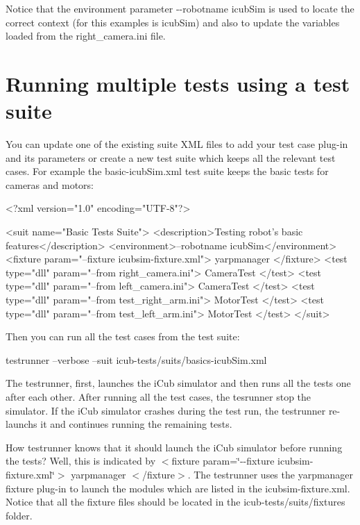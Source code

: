Notice that the environment parameter {\ttfamily -\/-\/robotname icub\-Sim} is used to locate the correct context (for this examples is {\ttfamily icub\-Sim}) and also to update the variables loaded from the {\ttfamily right\-\_\-camera.\-ini} file.\hypertarget{writing-and-running_running_multiple_tests}{}\section{Running multiple tests using a test suite}\label{writing-and-running_running_multiple_tests}
You can update one of the existing suite X\-M\-L files to add your test case plug-\/in and its parameters or create a new test suite which keeps all the relevant test cases. For example the {\ttfamily basic-\/icub\-Sim.\-xml} test suite keeps the basic tests for cameras and motors\-:


\begin{DoxyCode}
<?xml version=\textcolor{stringliteral}{"1.0"} encoding=\textcolor{stringliteral}{"UTF-8"}?>

<suit name=\textcolor{stringliteral}{"Basic Tests Suite"}>
    <description>Testing robot\textcolor{stringliteral}{'s basic features</description>}
\textcolor{stringliteral}{    <environment>--robotname icubSim</environment>}
\textcolor{stringliteral}{    <fixture param="--fixture icubsim-fixture.xml"> yarpmanager </fixture>}
\textcolor{stringliteral}{}
\textcolor{stringliteral}{    }
\textcolor{stringliteral}{    <test type="dll" param="--from right\_camera.ini"> CameraTest </test>}
\textcolor{stringliteral}{    <test type="dll" param="--from left\_camera.ini"> CameraTest </test> }
\textcolor{stringliteral}{}
\textcolor{stringliteral}{    }
\textcolor{stringliteral}{    <test type="dll" param="--from test\_right\_arm.ini"> MotorTest </test>}
\textcolor{stringliteral}{    <test type="dll" param="--from test\_left\_arm.ini"> MotorTest </test>}
\textcolor{stringliteral}{</suit>}
\end{DoxyCode}


Then you can run all the test cases from the test suite\-:


\begin{DoxyCode}
testrunner --verbose --suit icub-tests/suits/basics-icubSim.xml
\end{DoxyCode}


The {\ttfamily testrunner}, first, launches the i\-Cub simulator and then runs all the tests one after each other. After running all the test cases, the {\ttfamily tesrunner} stop the simulator. If the i\-Cub simulator crashes during the test run, the {\ttfamily testrunner} re-\/launchs it and continues running the remaining tests.

How {\ttfamily testrunner} knows that it should launch the i\-Cub simulator before running the tests? Well, this is indicated by {\ttfamily $<$fixture param=\char`\"{}-\/-\/fixture icubsim-\/fixture.\-xml\char`\"{}$>$ yarpmanager $<$/fixture$>$}. The {\ttfamily testrunner} uses the {\ttfamily yarpmanager} fixture plug-\/in to launch the modules which are listed in the {\ttfamily icubsim-\/fixture.\-xml}. Notice that all the fixture files should be located in the {\ttfamily icub-\/tests/suits/fixtures} folder. 